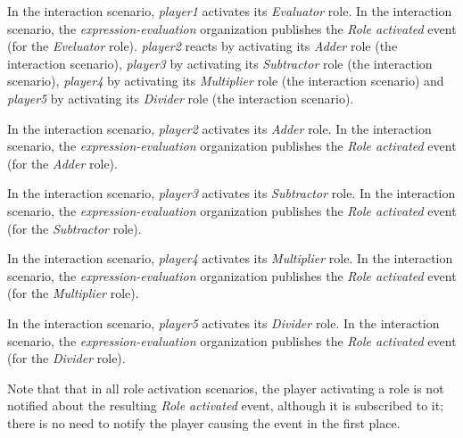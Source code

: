 In the {} interaction scenario, \textit{player1} activates its \textit{Evaluator} role.
In the {} interaction scenario, the \textit{expression-evaluation} organization publishes the \textit{Role activated} event (for the \textit{Eveluator} role).
\textit{player2} reacts by activating its \textit{Adder} role (the {} interaction scenario), \textit{player3} by activating its \textit{Subtractor} role (the {} interaction scenario), \textit{player4} by activating its \textit{Multiplier} role (the {} interaction scenario) and \textit{player5} by activating its \textit{Divider} role (the {} interaction scenario).

In the {} interaction scenario, \textit{player2} activates its \textit{Adder} role.
In the {} interaction scenario, the \textit{expression-evaluation} organization publishes the \textit{Role activated} event (for the \textit{Adder} role).

In the {} interaction scenario, \textit{player3} activates its \textit{Subtractor} role.
In the {} interaction scenario, the \textit{expression-evaluation} organization publishes the \textit{Role activated} event (for the \textit{Subtractor} role).

In the {} interaction scenario, \textit{player4} activates its \textit{Multiplier} role.
In the {} interaction scenario, the \textit{expression-evaluation} organization publishes the \textit{Role activated} event (for the \textit{Multiplier} role).

In the {} interaction scenario, \textit{player5} activates its \textit{Divider} role.
In the {} interaction scenario, the \textit{expression-evaluation} organization publishes the \textit{Role activated} event (for the \textit{Divider} role).

Note that that in all role activation scenarios, the player activating a role is not notified about the resulting \textit{Role activated} event, although it is subscribed to it; there is no need to notify the player causing the event in the first place.


